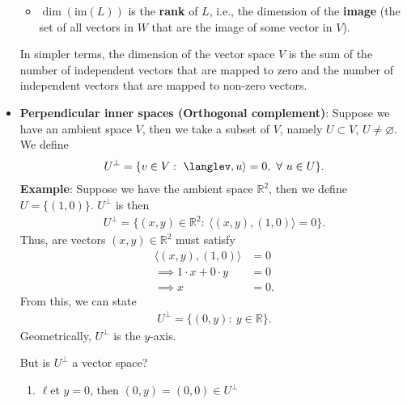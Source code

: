 \documentclass{report}
\begin{document}
\begin{itemize}
\begin{itemize}
                \item \( \dim(\text{im}(L)) \) is the \textbf{rank} of \( L \), i.e., the dimension of the \textbf{image} (the set of all vectors in \( W \) that are the image of some vector in \( V \)).
            \end{itemize}
            In simpler terms, the dimension of the vector space \( V \) is the sum of the number of independent vectors that are mapped to zero and the number of independent vectors that are mapped to non-zero vectors.
        \item \textbf{Perpendicular inner spaces (Orthogonal complement)}: Suppose we have an ambient space $V$, then we take a subset of $V$, namely $U\subset V$, $U\ne \varnothing$. We define
            \begin{align*}
                U^{\perp} = \{v\in V :\ \langlev,u\rangle = 0, \ \forall \ u\in U\}
            .\end{align*}
            \bigbreak \noindent 
            \textbf{Example}: Suppose we have the ambient space $\mathbb{R}^{2}$, then we define $U = \{(1,0)\} $. $U^{\perp}$ is then
            \begin{align*}
                U^{\perp} = \{(x,y)\in \mathbb{R}^{2}:\ \langle(x,y), (1,0)\rangle = 0\}
            .\end{align*}
            Thus, are vectors $(x,y) \in \mathbb{R}^{2}$ must satisfy
            \begin{align*}
                \langle(x,y), (1,0)\rangle &= 0 \\
                \implies 1 \cdot x + 0 \cdot y &= 0 \\
                \implies x &= 0 
            .\end{align*}
            \bigbreak \noindent 
            From this, we can state
            \begin{align*}
                U^{\perp} = \{(0,y):\ y \in \mathbb{R}\} 
            .\end{align*}
            \bigbreak \noindent 
            Geometrically, $U^{\perp}$ is the $y$-axis.
            \bigbreak \noindent 
            \begin{figure}[ht]
                \centering
                \label{fig:geom2}
            \end{figure}
            \bigbreak \noindent 
            But is $U^{\perp}$ a vector space?
            \begin{enumerate}
                \item $\ell$et $y=0$, then $(0,y) = (0,0) \in U^{\perp}$

\end{enumerate}
\end{itemize}
\end{document}
